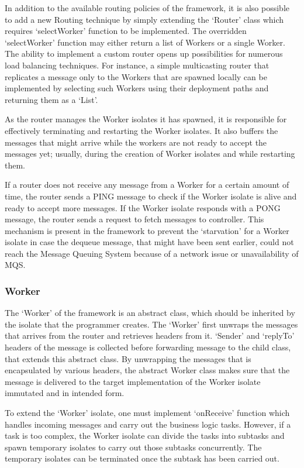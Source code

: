     In addition to the available routing policies of the framework, it is also possible to add a new Routing technique by simply extending the ‘Router’ class which requires ‘selectWorker’ function to be implemented. The overridden ‘selectWorker’ function may either return a list of Workers or a single Worker. The ability to implement a custom router opens up possibilities for numerous load balancing techniques. For instance, a simple multicasting router that replicates a message only to the Workers that are spawned locally can be implemented by selecting such Workers using their deployment paths and returning them as a ‘List’.

    As the router manages the Worker isolates it has spawned, it is responsible for effectively terminating and restarting the Worker isolates. It also buffers the messages that might arrive while the workers are not ready to accept the messages yet; usually, during the creation of Worker isolates and while restarting them.

    If a router does not receive any message from a Worker for a certain amount of time, the router sends a PING message to check if the Worker isolate is alive and ready to accept more messages. If the Worker isolate responds with a PONG message, the router sends a request to fetch messages to controller. This mechanism is present in the framework to prevent the ‘starvation’ for a Worker isolate in case the dequeue message, that might have been sent earlier, could not reach the Message Queuing System because of a network issue or unavailability of MQS.

  \subsubsection{Worker}
  The ‘Worker’ of the framework is an abstract class, which should be inherited by the isolate that the programmer creates. The ‘Worker’ first unwraps the messages that arrives from the router and retrieves headers from it. ‘Sender’ and ‘replyTo’ headers of the message is collected before forwarding message to the child class, that extends this abstract class. By unwrapping the messages that is encapsulated by various headers, the abstract Worker class makes sure that the message is delivered to the target implementation of the Worker isolate immutated and in intended form.

  To extend the ‘Worker’ isolate, one must implement ‘onReceive’ function which handles incoming messages and carry out the business logic tasks. However, if a task is too complex, the Worker isolate can divide the tasks into subtasks and spawn temporary isolates to carry out those subtasks concurrently. The temporary isolates can be terminated once the subtask has been carried out.

